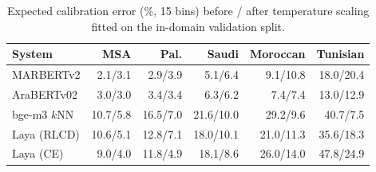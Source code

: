 \begin{table}[t]\centering\small\setlength{\tabcolsep}{4pt}\caption{Expected calibration error (\%, 15 bins) before / after temperature scaling fitted on the in-domain validation split.}\label{tab:calib}
\begin{tabular}{lrrrrr}\toprule
System & MSA & Pal. & Saudi & Moroccan & Tunisian \\\midrule
MARBERTv2 & 2.1/3.1 & 2.9/3.9 & 5.1/6.4 & 9.1/10.8 & 18.0/20.4 \\
AraBERTv02 & 3.0/3.0 & 3.4/3.4 & 6.3/6.2 & 7.4/7.4 & 13.0/12.9 \\
bge-m3 $k$NN & 10.7/5.8 & 16.5/7.0 & 21.6/10.0 & 29.2/9.6 & 40.7/7.5 \\
Laya (RLCD) & 10.6/5.1 & 12.8/7.1 & 18.0/10.1 & 21.0/11.3 & 35.6/18.3 \\
Laya (CE) & 9.0/4.0 & 11.8/4.9 & 18.1/8.6 & 26.0/14.0 & 47.8/24.9 \\
\bottomrule\end{tabular}\end{table}
